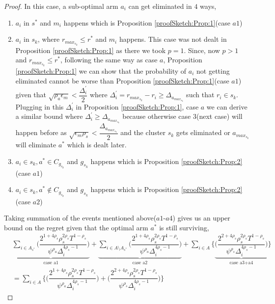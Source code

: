 \begin{proof}
	In this case, a sub-optimal arm $a_{i}$ can get eliminated in $4$ ways,
\begin{enumerate}
\item $a_{i}$ in $s^{*}$ and $m_{i}$ happens which is Proposition \ref{proofSketch:Prop:1}(case $a1$)
\item $a_{i}$ in $s_{k}$, where $r_{max_{s_{k}}}\leq r^{*}$ and $m_{i}$ happens. This case was not dealt in Proposition \ref{proofSketch:Prop:1} as there we took $p=1$. Since, now $p>1$ and $r_{max_{s_{k}}}\leq r^{*}$, following the same way as case $a$, Proposition \ref{proofSketch:Prop:1} we can show that the probability of $a_{i}$ not getting eliminated  cannot be worse than Proposition \ref{proofSketch:Prop:1}(case $a1$) given that $\sqrt{\rho_{a}\epsilon_{m}}< \dfrac{\Delta^{'}_{i}}{2}$ where $\Delta^{'}_{i}=r_{max_{s_{k}}} - r_{i}\geq\Delta_{a_{max_{s_{k}}}}$ such that $r_{i}\in s_{k}$. Plugging in this $\Delta^{'}_{i}$ in Proposition \ref{proofSketch:Prop:1}, case $a$ we can derive a similar bound where $\Delta^{'}_{i}\geq \Delta_{a_{max_{s_{k}}}}$ because otherwise case $3$(next case) will happen before as $\sqrt{\epsilon_{m}\rho_{s}}< \dfrac{\Delta_{a_{max_{s_{k}}}}}{2}$ and the cluster $s_{k}$ gets eliminated or $a_{max_{s_{k}}}$ will eliminate $a^{*}$ which is dealt later.
\item $a_{i}\in s_{k}, a^{*}\in C_{g_{s_{k}}}$ and $g_{s_{k}}$ happens which is Proposition \ref{proofSketch:Prop:2}(case $a1$)
\item $a_{i}\in s_{k}, a^{*}\notin C_{g_{s_{k}}}$ and $g_{s_{k}}$ happens which is Proposition \ref{proofSketch:Prop:2}(case $a2$)
\end{enumerate}
Taking summation of the events mentioned above($a1$-$a4$) gives us an upper bound on the regret given that the optimal arm $a^{*}$ is still surviving, 
\begin{align*}
 &\underbrace{\sum_{i\in A_{s^{*}}}\bigg(\dfrac{2^{1+4\rho_{s}}\rho_{s}^{2\rho_{s}}T^{1-\rho_{s}}}{\psi^{\rho_{a}}\Delta_{i}^{4\rho_{s}-1}}\bigg)}_{\text{case a1}} + \underbrace{\sum_{i\in A\setminus A_{s^{*}}}\bigg(\dfrac{2^{1+4\rho_{s}}\rho_{s}^{2\rho_{s}}T^{1-\rho_{s}}}{\psi^{\rho_{a}}\Delta_{i}^{4\rho_{s}-1}}\bigg)}_{\text{case a2}} + \sum_{i\in A}\bigg\lbrace \underbrace{\bigg(\dfrac{2^{2+4\rho_{s}}\rho_{s}^{2\rho_{s}}T^{1-\rho_{s}}}{\psi^{\rho_{s}}\Delta_{i}^{4\rho_{s}-1}}\bigg)}_{\text{case a3+a4}}\bigg\rbrace \\
& = \sum_{i\in A}\bigg\lbrace \bigg(\dfrac{2^{1+4\rho_{s}}\rho_{s}^{2\rho_{s}}T^{1-\rho_{s}}}{\psi^{\rho_{a}}\Delta_{i}^{4\rho_{s}-1}}\bigg) + \bigg(\dfrac{2^{2+4\rho_{s}}\rho_{s}^{2\rho_{s}}T^{1-\rho_{s}}}{\psi^{\rho_{s}}\Delta_{i}^{4\rho_{s}-1}}\bigg)\bigg\rbrace
\end{align*}



\end{proof}
